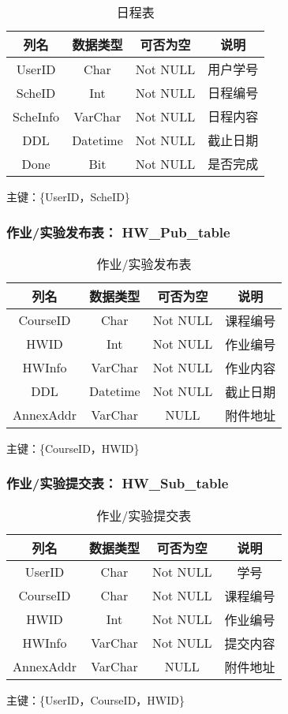 \begin{table}[htbp]
\centering
\caption{日程表} \label{tab:classification}
\begin{tabular}{|c|c|c|c|}
    \hline
    列名 & 数据类型 & 可否为空 & 说明 \\
    \hline
    UserID & Char & Not NULL & 用户学号 \\
    \hline
    ScheID & Int & Not NULL & 日程编号 \\
    \hline
    ScheInfo & VarChar & Not NULL & 日程内容 \\
    \hline
    DDL & Datetime & Not NULL & 截止日期 \\
    \hline
    Done & Bit & Not NULL & 是否完成 \\
    \hline
\end{tabular}
\end{table}
主键：\{UserID，ScheID\}


\subsubsection{作业/实验发布表： HW\_Pub\_table}

\begin{table}[htbp]
\centering
\caption{作业/实验发布表} \label{tab:classification}
\begin{tabular}{|c|c|c|c|}
    \hline
    列名 & 数据类型 & 可否为空 & 说明 \\
    \hline
    CourseID & Char & Not NULL & 课程编号 \\
    \hline
    HWID & Int & Not NULL & 作业编号 \\
    \hline
    HWInfo & VarChar & Not NULL & 作业内容 \\
    \hline
    DDL & Datetime & Not NULL & 截止日期 \\
    \hline
    AnnexAddr & VarChar & NULL & 附件地址 \\
    \hline
\end{tabular}
\end{table}
主键：\{CourseID，HWID\}


\subsubsection{作业/实验提交表： HW\_Sub\_table}

\begin{table}[htbp]
\centering
\caption{作业/实验提交表} \label{tab:classification}
\begin{tabular}{|c|c|c|c|}
    \hline
    列名 & 数据类型 & 可否为空 & 说明 \\
	\hline
    UserID & Char & Not NULL & 学号 \\
    \hline
    CourseID & Char & Not NULL & 课程编号 \\
    \hline
    HWID & Int & Not NULL & 作业编号 \\
    \hline
    HWInfo & VarChar & Not NULL & 提交内容 \\
    \hline
    AnnexAddr & VarChar & NULL & 附件地址 \\
    \hline
\end{tabular}
\end{table}
主键：\{UserID，CourseID，HWID\}


